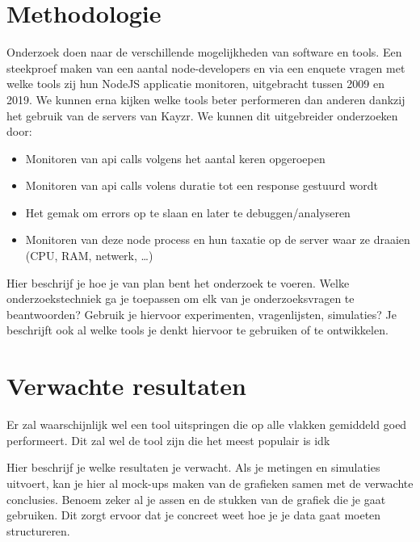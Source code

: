 \section{Methodologie}
\label{sec:methodologie}

Onderzoek doen naar de verschillende mogelijkheden van software en tools. Een steekproef maken van een aantal node-developers en via een enquete vragen met welke tools zij hun NodeJS applicatie monitoren, uitgebracht tussen 2009 en 2019. We kunnen erna kijken welke tools beter performeren dan anderen dankzij het gebruik van de servers van Kayzr. We kunnen dit uitgebreider onderzoeken door:

\begin{itemize}
	\item Monitoren van api calls volgens het aantal keren opgeroepen
	\item Monitoren van api calls volens duratie tot een response gestuurd wordt
	\item Het gemak om errors op te slaan en later te debuggen/analyseren
	\item Monitoren van deze node process en hun taxatie op de server waar ze draaien (CPU, RAM, netwerk, …)
\end{itemize}

Hier beschrijf je hoe je van plan bent het onderzoek te voeren. Welke onderzoekstechniek ga je toepassen om elk van je onderzoeksvragen te beantwoorden? Gebruik je hiervoor experimenten, vragenlijsten, simulaties? Je beschrijft ook al welke tools je denkt hiervoor te gebruiken of te ontwikkelen. 

\section{Verwachte resultaten}
\label{sec:verwachte_resultaten}

Er zal waarschijnlijk wel een tool uitspringen die op alle vlakken gemiddeld goed performeert. Dit zal wel de tool zijn die het meest populair is idk

Hier beschrijf je welke resultaten je verwacht. Als je metingen en simulaties uitvoert, kan je hier al mock-ups maken van de grafieken samen met de verwachte conclusies. Benoem zeker al je assen en de stukken van de grafiek die je gaat gebruiken. Dit zorgt ervoor dat je concreet weet hoe je je data gaat moeten structureren.

